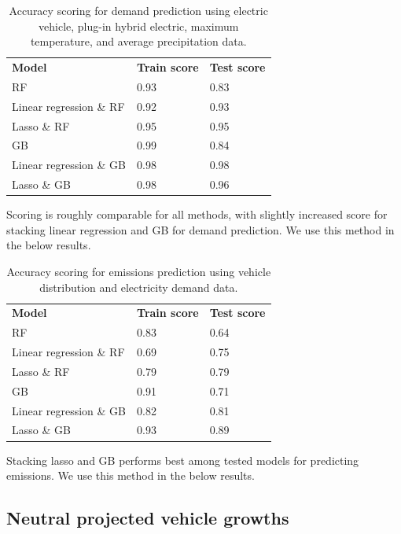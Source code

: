 \documentclass{article}
\begin{document}
\begin{table}[H]
    \begin{center}
        \begin{tabular}{lll}
        \textbf{Model} & \textbf{Train score} & \textbf{Test score}\\
        RF & 0.93 & 0.83 \\
        Linear regression \& RF & 0.92 & 0.93\\
        Lasso \& RF & 0.95 & 0.95\\
        GB & 0.99 & 0.84 \\
        Linear regression \& GB & 0.98 & 0.98 \\
        Lasso \& GB & 0.98 & 0.96\\
    \end{tabular}
    \end{center}
    \caption{\label{}Accuracy scoring for demand prediction using electric vehicle, plug-in hybrid electric, maximum temperature, and average precipitation data.}
\end{table}
Scoring is roughly comparable for all methods, with slightly increased score for stacking linear regression and GB for demand prediction. We use this method in the below results.

\begin{table}[H]
    \begin{center}
            \begin{tabular}{lll}
        \textbf{Model} & \textbf{Train score} & \textbf{Test score}\\
        RF & 0.83 & 0.64 \\
        Linear regression \& RF & 0.69 & 0.75\\
        Lasso \& RF & 0.79 & 0.79\\
        GB & 0.91 & 0.71 \\
        Linear regression \& GB & 0.82 & 0.81 \\
        Lasso \& GB & 0.93 & 0.89\\
    \end{tabular}
    \end{center}
    \caption{\label{}Accuracy scoring for emissions prediction using vehicle distribution and electricity demand data.}
\end{table}

Stacking lasso and GB performs best among tested models for predicting emissions. We use this method in the below results.

\subsection{\label{results1}Neutral projected vehicle growths}
\end{document}
